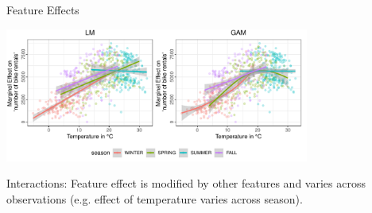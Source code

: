 \documentclass[11pt,compress,t,notes=noshow, aspectratio=169, xcolor=table]{beamer}
\begin{document}
\begin{frame}{Feature Effects}

\centerline{\includegraphics[width=0.75\textwidth, trim=0cm 0.1cm 0cm 0cm, clip]{figure/lm_main_interactions}}

Interactions: Feature effect is modified by other features and varies across observations (e.g. effect of temperature varies across season).

\end{frame}

%
%
%
%
%
%
\end{document}
